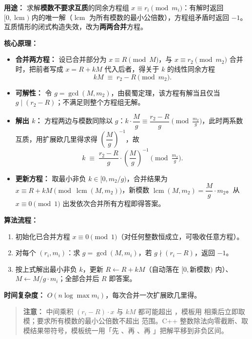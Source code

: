 \textbf{用途：}
求解\textbf{模数不要求互质}的同余方程组 $x \equiv r_i \pmod{m_i}$：有解时返回 $[0, \operatorname{lcm})$ 内的唯一解（$\operatorname{lcm}$ 为所有模数的最小公倍数），方程组矛盾时返回 $-1$。互质情形的闭式构造失效，改为\textbf{两两合并}方程。

\textbf{核心原理：}

\begin{itemize}
  \item \textbf{合并两方程：} 设已合并部分为 $x \equiv R \pmod{M}$，与 $x \equiv r_2 \pmod{m_2}$ 合并时，把前者写成 $x = R + kM$ 代入后者，得关于 $k$ 的线性同余方程
  \[ kM \;\equiv\; r_2 - R \pmod{m_2}. \]
  \item \textbf{可解性：} 令 $g = \gcd(M, m_2)$，由裴蜀定理，该方程有解当且仅当 $g \mid (r_2 - R)$；不满足则整个方程组无解。
  \item \textbf{解出 $k$：} 方程两边与模数同除以 $g$：$k \cdot \dfrac{M}{g} \equiv \dfrac{r_2 - R}{g} \pmod{\tfrac{m_2}{g}}$，此时两系数互质，用扩展欧几里得求得 $\left(\dfrac{M}{g}\right)^{-1}$，故
  \[ k \;\equiv\; \frac{r_2 - R}{g} \cdot \left(\frac{M}{g}\right)^{-1} \pmod{\tfrac{m_2}{g}}. \]
  \item \textbf{更新方程：} 取最小非负 $k \in [0, m_2/g)$，合并结果为 $x \equiv R + kM \pmod{\operatorname{lcm}(M, m_2)}$，新模数 $\operatorname{lcm}(M, m_2) = \dfrac{M}{g} \cdot m_2$。从 $x \equiv 0 \pmod 1$ 出发依次合并所有方程即得答案。
\end{itemize}

\textbf{算法流程：}

\begin{enumerate}
  \item 初始化已合并方程 $x \equiv 0 \pmod 1$（对任何整数恒成立，可吸收任意方程）。
  \item 对每个 $(r_i, m_i)$：求 $g = \gcd(M, m_i)$，若 $g \nmid (r_i - R)$，返回 $-1$。
  \item 按上式解出最小非负 $k$，更新 $R \gets R + kM$（自动落在 $[0, \text{新模数})$ 内）、$M \gets M/g \cdot m_i$；全部合并后 $R$ 即答案。
\end{enumerate}

\textbf{时间复杂度：} $O(n \log \max m_i)$，每次合并一次扩展欧几里得。



\begin{quote}
\textbf{注意：} 中间乘积 $(r_i - R) \cdot x$ 与 $kM$ 都可能超出 ，模板用  相乘后立即取模；要求所有模数的最小公倍数不超出  范围。C++ 整数除法向零截断、取模结果带符号，模板统一用「先 \code{\%}、再 \code{+}、再 \code{\%}」把解平移到非负区间。
\end{quote}

